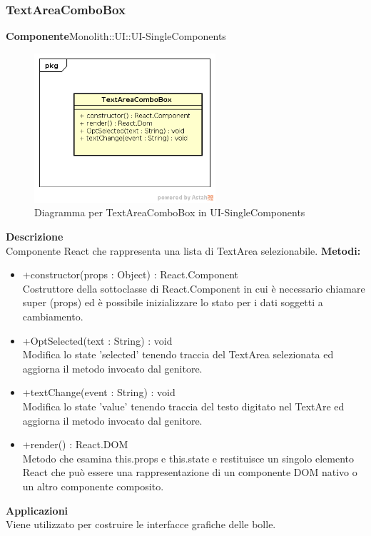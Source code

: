 \subsubsection{TextAreaComboBox}
\textbf{Componente}Monolith::UI::UI-SingleComponents\\
   \FloatBarrier
   \begin{figure}[ht]
   \centering
   \includegraphics[width=0.6\textwidth]{img/single-TextAreaComboBox}
   \caption{{Diagramma per TextAreaComboBox in UI-SingleComponents}}
\end{figure}
\FloatBarrier
\textbf{Descrizione}\\
Componente React che rappresenta una lista di TextArea selezionabile.
\textbf{Metodi:} \begin{itemize}\item +constructor(props : Object) : React.Component \\Costruttore della sottoclasse di React.Component in cui è necessario chiamare super (props) ed è possibile inizializzare lo stato per i dati soggetti a cambiamento.\item +OptSelected(text : String) : void \\Modifica lo state 'selected' tenendo traccia del TextArea selezionata ed aggiorna il metodo invocato dal genitore.\item +textChange(event : String) : void  \\Modifica lo state 'value' tenendo traccia del testo digitato nel TextAre ed aggiorna il metodo invocato dal genitore.\item +render() : React.DOM \\Metodo che esamina this.props e this.state e restituisce un singolo elemento React che può essere una rappresentazione di un componente DOM nativo o un altro componente composito.\end{itemize} 


\textbf{Applicazioni}\\
Viene utilizzato per costruire le interfacce grafiche delle bolle. 



